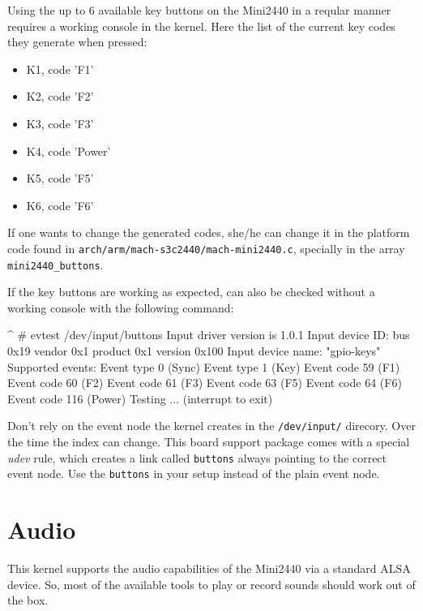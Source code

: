 Using the up to 6 available key buttons on the Mini2440 in a reqular manner
requires a working console in the kernel. Here the list of the current key codes
they generate when pressed:

\begin{itemize}
	\item K1, code 'F1'
	\item K2, code 'F2'
	\item K3, code 'F3'
	\item K4, code 'Power'
	\item K5, code 'F5'
	\item K6, code 'F6'
\end{itemize}

If one wants to change the generated codes, she/he can change it in the
platform code found in \texttt{arch/arm/mach-s3c2440/mach-mini2440.c},
specially in the array \texttt{mini2440\_buttons}.

If the key buttons are working as expected, can also be checked without a
working console with the following command:

\begin{ptxshell}[escapechar=|]{^}
# evtest /dev/input/buttons
Input driver version is 1.0.1
Input device ID: bus 0x19 vendor 0x1 product 0x1 version 0x100
Input device name: "gpio-keys"
Supported events:
  Event type 0 (Sync)
  Event type 1 (Key)
    Event code 59 (F1)
    Event code 60 (F2)
    Event code 61 (F3)
    Event code 63 (F5)
    Event code 64 (F6)
    Event code 116 (Power)
Testing ... (interrupt to exit)
\end{ptxshell}

\begin{important}
Don't rely on the event node the kernel creates in the \texttt{/dev/input/}
direcory. Over the time the index can change. This board support package comes
with a special \textit{udev} rule, which creates a link called \texttt{buttons}
always pointing to the correct event node. Use the \texttt{buttons} in your
setup instead of the plain event node.
\end{important}


\section{Audio}						\label{sec:AUDIO}

This kernel supports the audio capabilities of the Mini2440 via a standard
ALSA device. So, most of the available tools to play or record sounds should
work out of the box.

